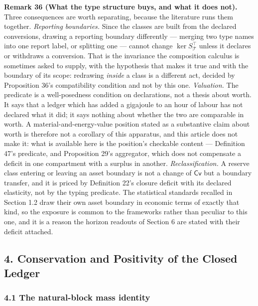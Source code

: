 \documentclass[11pt]{article}
\begin{document}
\textbf{Remark 36 (What the type structure buys, and what it does not).} Three consequences are worth separating,
because the literature runs them together. \emph{Reporting boundaries.} Since the classes are built from the
declared conversions, drawing a reporting boundary differently --- merging two type names into one report
label, or splitting one --- cannot change \(\ker S_{\mathcal{T}}^{\top}\) unless it declares or withdraws a
conversion. That is the invariance the composition calculus is sometimes asked to supply, with the hypothesis
that makes it true and with the boundary of its scope: redrawing \emph{inside} a class is a different act, decided
by Proposition 36's compatibility condition and not by this one. \emph{Valuation.} The predicate is a
well-posedness condition on declarations, not a thesis about worth. It says that a ledger which has added a
gigajoule to an hour of labour has not declared what it did; it says nothing about whether the two are
comparable in worth. A material-and-energy-value position stated as a substantive claim about worth is
therefore not a corollary of this apparatus, and this article does not make it: what is available here is the
position's checkable content --- Definition 47's predicate, and Proposition 29's aggregator, which does not
compensate a deficit in one compartment with a surplus in another. \emph{Reclassification.} A reserve class
entering or leaving an asset boundary is not a change of \(\mathsf{Cv}\) but a boundary transfer, and it is
priced by Definition 22's closure deficit with its declared elasticity, not by the typing predicate. The
statistical standards recalled in Section 1.2 draw their own asset boundary in economic terms of exactly that
kind, so the exposure is common to the frameworks rather than peculiar to this one, and it is a reason the
horizon readouts of Section 6 are stated with their deficit attached.



\subsection{4. Conservation and Positivity of the Closed
Ledger}\label{conservation-and-positivity-of-the-closed-ledger}

\subsubsection{4.1 The natural-block mass
identity}\label{the-natural-block-mass-identity}
\end{document}
